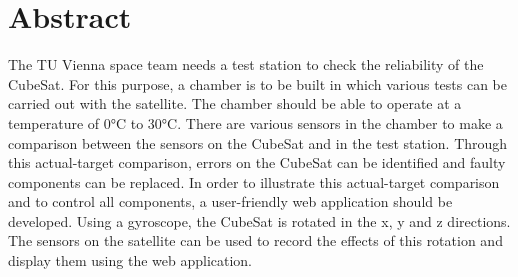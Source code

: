 \section{Abstract}
The TU Vienna space team needs a test station to check the reliability of the CubeSat. For this purpose, a chamber is to be built in which various tests can be carried out with the satellite. The chamber should be able to operate at a temperature of 0°C to 30°C. There are various sensors in the chamber to make a comparison between the sensors on the CubeSat and in the test station. Through this actual-target comparison, errors on the CubeSat can be identified and faulty components can be replaced. In order to illustrate this actual-target comparison and to control all components, a user-friendly web application should be developed. Using a gyroscope, the CubeSat is rotated in the x, y and z directions. The sensors on the satellite can be used to record the effects of this rotation and display them using the web application.

